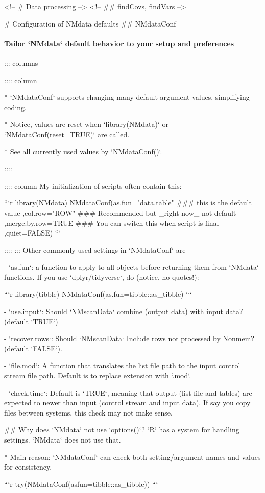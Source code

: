 {{{{{{<!-- # Data processing -->
<!-- ## findCovs, findVars -->

# Configuration of NMdata defaults
## NMdataConf
\framesubtitle{Tailor `NMdata` default behavior to your setup and preferences}
::: columns

:::: column

* `NMdataConf` supports changing many default argument values, simplifying coding. 

* Notice, values are reset when `library(NMdata)` or `NMdataConf(reset=TRUE)` are called. 

* See all currently used values by `NMdataConf()`.

::::

:::: column
My initialization of scripts often contain this: 

```r
library(NMdata)
NMdataConf(as.fun="data.table"
### this is the default value
          ,col.row="ROW"
### Recommended but _right now_ not default
          ,merge.by.row=TRUE
### You can switch this when script is final
          ,quiet=FALSE)
```

::::
:::
Other commonly used settings in `NMdataConf` are

- `as.fun`: a function to apply to all objects before returning them from `NMdata` functions. If you use `dplyr/tidyverse`, do (notice, no quotes!):

```r
library(tibble)
NMdataConf(as.fun=tibble::as_tibble)
```

- `use.input`: Should `NMscanData` combine (output data) with input data? (default `TRUE`)

- `recover.rows`: Should `NMscanData` Include rows not processed by Nonmem? (default `FALSE`).

- `file.mod`: A function that translates the list file path to the input control stream file path. Default is to replace extension with `.mod`.

- `check.time`: Default is `TRUE`, meaning that output (list file and tables) are expected to newer than input (control stream and input data). If say you copy files between systems, this check may not make sense.

## Why does `NMdata` not use `options()`?
`R` has a system for handling settings. `NMdata` does not use that.

* Main reason: `NMdataConf` can check both setting/argument names and values for consistency. 

```r
try(NMdataConf(asfun=tibble::as_tibble))
```

}}}}}}
